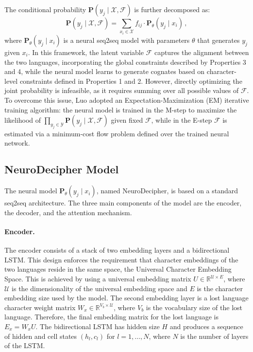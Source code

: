 The conditional probability $\mathbf{P}(y_j \mid \mathcal{X}, \mathcal{F})$ is further decomposed as:
\[
\mathbf{P}(y_j \mid \mathcal{X}, \mathcal{F})
= \sum_{x_i\in \mathcal{X}} f_{ij}\cdot \mathbf{P}_{\theta}(y_j \mid x_i) \, ,
\]
where $\mathbf{P}_{\theta}(y_j \mid x_i)$ is a neural seq2seq model with parameters $\theta$ that generates $y_j$ given $x_i$.
In this framework, the latent variable $\mathcal{F}$ captures the alignment between the two languages, incorporating the global constraints described by Properties 3 and 4, while the neural model learns to generate cognates based on character-level constraints defined in Properties 1 and 2.
However, directly optimizing the joint probability is infeasible, as it requires summing over all possible values of $\mathcal{F}$.
To overcome this issue, Luo adopted an Expectation-Maximization (EM) iterative training algorithm: the neural model is trained in the M-step to maximize the likelihood of $\prod_{y_j\in \mathcal{Y}} \mathbf{P}(y_j \mid \mathcal{X}, \mathcal{F})$ given fixed $\mathcal{F}$, while in the E-step $\mathcal{F}$ is estimated via a minimum-cost flow problem defined over the trained neural network.

\subsection{NeuroDecipher Model}
The neural model $\mathbf{P}_{\theta}(y_j \mid x_i)$, named NeuroDecipher, is based on a standard seq2seq architecture.
The three main components of the model are the encoder, the decoder, and the attention mechanism.

\paragraph{Encoder.}
The encoder consists of a stack of two embedding layers and a bidirectional LSTM.
This design enforces the requirement that character embeddings of the two languages reside in the same space, the Universal Character Embedding Space.
This is achieved by using a universal embedding matrix $U\in\mathbb{R}^{\mathcal{U}\times E}$, where $\mathcal{U}$ is the dimensionality of the universal embedding space and $E$ is the character embedding size used by the model.
The second embedding layer is a lost language character weight matrix $W_x\in\mathbb{R}^{V_b\times \mathcal{U}}$, where $V_b$ is the vocabulary size of the lost language.
Therefore, the final embedding matrix for the lost language is $E_x = W_x U$.
The bidirectional LSTM has hidden size $H$ and produces a sequence of hidden and cell states $(h_l,c_l)$ for $l=1,\ldots,N$, where $N$ is the number of layers of the LSTM.

